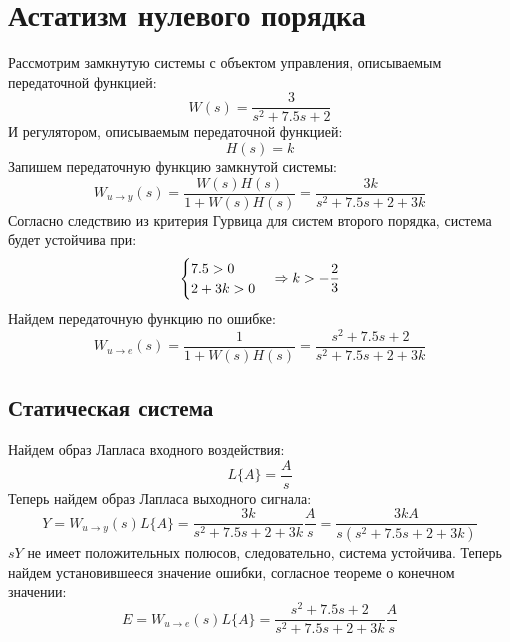 \section{Астатизм нулевого порядка}
Рассмотрим замкнутую системы с объектом управления, описываемым передаточной функцией:
\begin{equation}
    W(s) = \frac{3}{s^2 + 7.5s + 2}
\end{equation}
И регулятором, описываемым передаточной функцией:
\begin{equation}
   H(s) = k
\end{equation}
Запишем передаточную функцию замкнутой системы:
\begin{equation}
    W_{u\rightarrow y}(s) = \frac{W(s)H(s)}{1 + W(s)H(s)} = \frac{3k}{s^2 + 7.5s + 2 + 3k}
\end{equation}
Согласно следствию из критерия Гурвица для систем второго порядка, система будет устойчива при:
\begin{equation}
    \begin{cases}
        7.5 > 0 \\ 
        2 + 3k > 0 \\ 
    \end{cases}
    \Rightarrow
    k > -\frac{2}{3} \\ 
\end{equation}
Найдем передаточную функцию по ошибке:
\begin{equation}
    W_{u\rightarrow e}(s) = \frac{1}{1 + W(s)H(s)} = \frac{s^2 + 7.5s + 2}{s^2 + 7.5s + 2 + 3k}
\end{equation}

\subsection{Статическая система}
Найдем образ Лапласа входного воздействия:
\begin{equation}
    L\{A\} = \frac{A}{s}
\end{equation}
Теперь найдем образ Лапласа выходного сигнала:
\begin{equation}
    Y = W_{u\rightarrow y}(s)L\{A\} = \frac{3k}{s^2 + 7.5s + 2 + 3k}\frac{A}{s} = \frac{3kA}{s(s^2 + 7.5s + 2 + 3k)}
\end{equation}
$sY$ не имеет положительных полюсов, следовательно, система устойчива. Теперь найдем установившееся значение ошибки, 
согласное теореме о конечном значении:
\begin{equation}
    E = W_{u\rightarrow e}(s)L\{A\} = \frac{s^2 + 7.5s + 2}{s^2 + 7.5s + 2 + 3k}\frac{A}{s} 
\end{equation}

